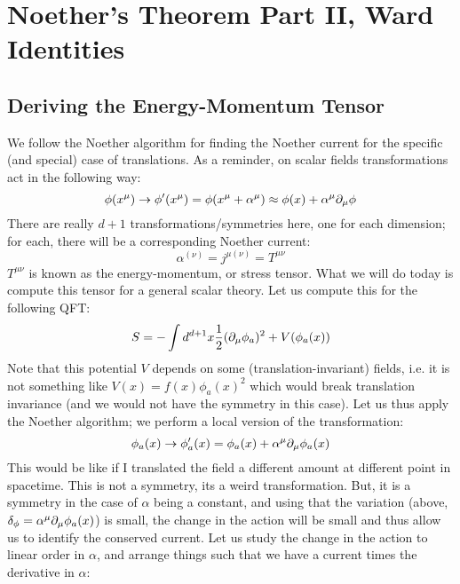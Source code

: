 \section{Noether's Theorem Part II, Ward Identities}
\subsection{Deriving the Energy-Momentum Tensor}
We follow the Noether algorithm for finding the Noether current for the specific (and special) case of translations. As a reminder, on scalar fields transformations act in the following way:
\begin{equation}
    \phi(x^\mu) \to \phi'(x^\mu) = \phi(x^\mu + \alpha^\mu) \approx \phi(x) + \alpha^\mu \partial_\mu \phi
\end{equation}
There are really $d+1$ transformations/symmetries here, one for each dimension; for each, there will be a corresponding Noether current:
\begin{equation}
    \alpha^{(\nu)} = j^{\mu(\nu)} = T^{\mu\nu}
\end{equation}
$T^{\mu\nu}$ is known as the energy-momentum, or stress tensor. What we will do today is compute this tensor for a general scalar theory. Let us compute this for the following QFT:
\begin{equation}
    S = -\int d^{d+1}x \frac{1}{2}(\partial_\mu \phi_a)^2 + V(\phi_a(x))
\end{equation}
Note that this potential $V$ depends on some (translation-invariant) fields, i.e. it is not something like $V(x) = f(x)\phi_a(x)^2$ which would break translation invariance (and we would not have the symmetry in this case). Let us thus apply the Noether algorithm; we perform a local version of the transformation:
\begin{equation}
    \phi_a(x) \to \phi_a'(x) = \phi_a(x) + \alpha^\mu \partial_\mu \phi_a(x)
\end{equation}
This would be like if I translated the field a different amount at different point in spacetime. This is not a symmetry, its a weird transformation. But, it is a symmetry in the case of $\alpha$ being a constant, and using that the variation (above, $\delta_\phi = \alpha^\mu \partial_\mu \phi_a(x)$) is small, the change in the action will be small and thus allow us to identify the conserved current. Let us study the change in the action to linear order in $\alpha$, and arrange things such that we have a current times the derivative in $\alpha$:
